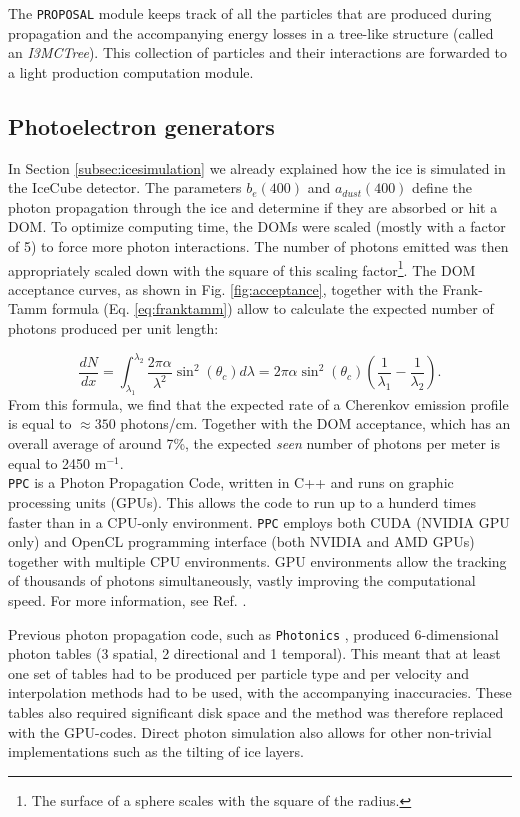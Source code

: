 \noindent The \texttt{PROPOSAL} module keeps track of all the particles that are produced during propagation and the accompanying energy losses in a tree-like structure (called an \textit{I3MCTree}). This collection of particles and their interactions are forwarded to a light production computation module.

\subsection{Photoelectron generators}
In Section \ref{subsec:icesimulation} we already explained how the ice is simulated in the IceCube detector. The parameters $b_e(400)$ and $a_{dust}(400)$ define the photon propagation through the ice and determine if they are absorbed or hit a DOM. To optimize computing time, the DOMs were scaled (mostly with a factor of 5) to force more photon interactions. The number of photons emitted was then appropriately scaled down with the square of this scaling factor\footnote{The surface of a sphere scales with the square of the radius.}. The DOM acceptance curves, as shown in Fig. \ref{fig:acceptance}, together with the Frank-Tamm formula (Eq. \ref{eq:franktamm}) allow to calculate the expected number of photons produced per unit length:

\begin{equation}
\frac{dN}{dx} = \int_{\lambda_1}^{\lambda_2} \frac{2 \pi \alpha}{\lambda^2} \sin^2 \left(\theta_c\right) d\lambda = 2\pi \alpha \sin^2 \left(\theta_c\right) \left(\frac{1}{\lambda_1} -\frac{1}{\lambda_2}\right).
\end{equation}
From this formula, we find that the expected rate of a Cherenkov emission profile is equal to $\approx 350$ photons/cm. Together with the DOM acceptance, which has an overall average of around 7\%, the expected \textit{seen} number of photons per meter is equal to 2450 m$^{-1}$.\\

\noindent \texttt{PPC} is a Photon Propagation Code, written in C++ and runs on graphic processing units (GPUs). This allows the code to run up to a hunderd times faster than in a CPU-only environment. \texttt{PPC} employs both CUDA (NVIDIA GPU only) and OpenCL programming interface (both NVIDIA and AMD GPUs) together with multiple CPU environments.
GPU environments allow the tracking of thousands of photons simultaneously, vastly improving the computational speed. For more information, see Ref. \cite{dimaspice}.

Previous photon propagation code, such as \texttt{Photonics}  \cite{Lundberg:2007mf}, produced 6-dimensional photon tables (3 spatial, 2 directional and 1 temporal). This meant that at least one set of tables had to be produced per particle type and per velocity and interpolation methods had to be used, with the accompanying inaccuracies. These tables also required significant disk space and the method was therefore replaced with the GPU-codes. Direct photon simulation also allows for other non-trivial implementations such as the tilting of ice layers.\\

